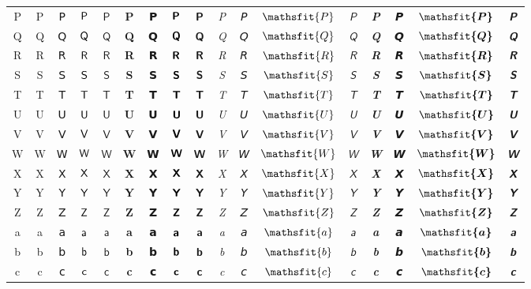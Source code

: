 \documentclass[10pt]{standalone}
\newcommand{\SANS}[1]{\ifmmode\mathsf{#1}\else\textsf{#1}\fi}
\newcommand{\BSANS}[1]{\ifmmode\boldsymbol{\mathsf{#1}}\else\textbf{\textsf{#1}}\fi}
\newcommand{\ISANS}[1]{\ifmmode\mathsfit{#1}\else\textit{\textsf{#1}}\fi}
\newcommand{\BISANS}[1]{\ifmmode\bm{\mathsfit{#1}}\else\textbf{\textsf{\textit{#1}}}\fi}
\begin{document}
\begin{tabular}{c|cc|cc|cc|cc|cc|cc|cc|cc}
P & \SANS{P} & 𝖯 & $\SANS{P}$ & $𝖯$ & \BSANS{P} & 𝗣 & $\BSANS{P}$ & $𝗣$ & \ISANS{P} & 𝘗 & $\ISANS{P}$ & $𝘗$ & \BISANS{P} & 𝙋 & $\BISANS{P}$ & $𝙋$  \\
Q & \SANS{Q} & 𝖰 & $\SANS{Q}$ & $𝖰$ & \BSANS{Q} & 𝗤 & $\BSANS{Q}$ & $𝗤$ & \ISANS{Q} & 𝘘 & $\ISANS{Q}$ & $𝘘$ & \BISANS{Q} & 𝙌 & $\BISANS{Q}$ & $𝙌$  \\
R & \SANS{R} & 𝖱 & $\SANS{R}$ & $𝖱$ & \BSANS{R} & 𝗥 & $\BSANS{R}$ & $𝗥$ & \ISANS{R} & 𝘙 & $\ISANS{R}$ & $𝘙$ & \BISANS{R} & 𝙍 & $\BISANS{R}$ & $𝙍$  \\
S & \SANS{S} & 𝖲 & $\SANS{S}$ & $𝖲$ & \BSANS{S} & 𝗦 & $\BSANS{S}$ & $𝗦$ & \ISANS{S} & 𝘚 & $\ISANS{S}$ & $𝘚$ & \BISANS{S} & 𝙎 & $\BISANS{S}$ & $𝙎$  \\
T & \SANS{T} & 𝖳 & $\SANS{T}$ & $𝖳$ & \BSANS{T} & 𝗧 & $\BSANS{T}$ & $𝗧$ & \ISANS{T} & 𝘛 & $\ISANS{T}$ & $𝘛$ & \BISANS{T} & 𝙏 & $\BISANS{T}$ & $𝙏$  \\
U & \SANS{U} & 𝖴 & $\SANS{U}$ & $𝖴$ & \BSANS{U} & 𝗨 & $\BSANS{U}$ & $𝗨$ & \ISANS{U} & 𝘜 & $\ISANS{U}$ & $𝘜$ & \BISANS{U} & 𝙐 & $\BISANS{U}$ & $𝙐$  \\
V & \SANS{V} & 𝖵 & $\SANS{V}$ & $𝖵$ & \BSANS{V} & 𝗩 & $\BSANS{V}$ & $𝗩$ & \ISANS{V} & 𝘝 & $\ISANS{V}$ & $𝘝$ & \BISANS{V} & 𝙑 & $\BISANS{V}$ & $𝙑$  \\
W & \SANS{W} & 𝖶 & $\SANS{W}$ & $𝖶$ & \BSANS{W} & 𝗪 & $\BSANS{W}$ & $𝗪$ & \ISANS{W} & 𝘞 & $\ISANS{W}$ & $𝘞$ & \BISANS{W} & 𝙒 & $\BISANS{W}$ & $𝙒$  \\
X & \SANS{X} & 𝖷 & $\SANS{X}$ & $𝖷$ & \BSANS{X} & 𝗫 & $\BSANS{X}$ & $𝗫$ & \ISANS{X} & 𝘟 & $\ISANS{X}$ & $𝘟$ & \BISANS{X} & 𝙓 & $\BISANS{X}$ & $𝙓$  \\
Y & \SANS{Y} & 𝖸 & $\SANS{Y}$ & $𝖸$ & \BSANS{Y} & 𝗬 & $\BSANS{Y}$ & $𝗬$ & \ISANS{Y} & 𝘠 & $\ISANS{Y}$ & $𝘠$ & \BISANS{Y} & 𝙔 & $\BISANS{Y}$ & $𝙔$  \\
Z & \SANS{Z} & 𝖹 & $\SANS{Z}$ & $𝖹$ & \BSANS{Z} & 𝗭 & $\BSANS{Z}$ & $𝗭$ & \ISANS{Z} & 𝘡 & $\ISANS{Z}$ & $𝘡$ & \BISANS{Z} & 𝙕 & $\BISANS{Z}$ & $𝙕$  \\
\midrule
a & \SANS{a} & 𝖺 & $\SANS{a}$ & $𝖺$ & \BSANS{a} & 𝗮 & $\BSANS{a}$ & $𝗮$ & \ISANS{a} & 𝘢 & $\ISANS{a}$ & $𝘢$ & \BISANS{a} & 𝙖 & $\BISANS{a}$ & $𝙖$ \\
b & \SANS{b} & 𝖻 & $\SANS{b}$ & $𝖻$ & \BSANS{b} & 𝗯 & $\BSANS{b}$ & $𝗯$ & \ISANS{b} & 𝘣 & $\ISANS{b}$ & $𝘣$ & \BISANS{b} & 𝙗 & $\BISANS{b}$ & $𝙗$ \\
c & \SANS{c} & 𝖼 & $\SANS{c}$ & $𝖼$ & \BSANS{c} & 𝗰 & $\BSANS{c}$ & $𝗰$ & \ISANS{c} & 𝘤 & $\ISANS{c}$ & $𝘤$ & \BISANS{c} & 𝙘 & $\BISANS{c}$ & $𝙘$ \\

\end{tabular}
\end{document}
